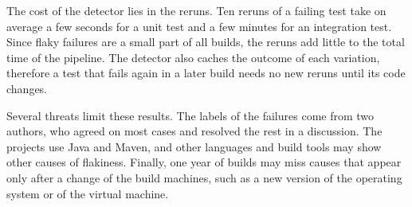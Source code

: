 The cost of the detector lies in the reruns. Ten reruns of a failing test take on average a few seconds for a unit
test and a few minutes for an integration test. Since flaky failures are a small part of all builds, the reruns add
little to the total time of the pipeline. The detector also caches the outcome of each variation, therefore a test
that fails again in a later build needs no new reruns until its code changes.

Several threats limit these results. The labels of the failures come from two authors, who agreed on most cases and
resolved the rest in a discussion. The projects use Java and Maven, and other languages and build tools may show other
causes of flakiness. Finally, one year of builds may miss causes that appear only after a change of the build
machines, such as a new version of the operating system or of the virtual machine.
